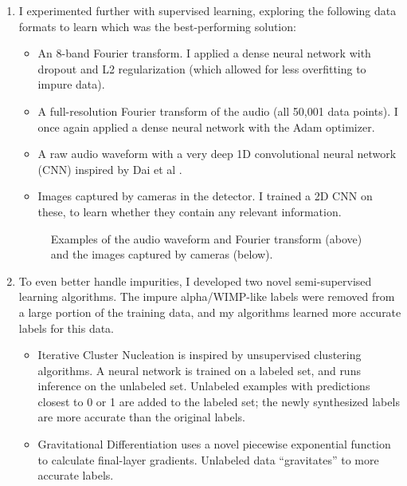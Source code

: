 \documentclass[12pt]{article}
\begin{document}
\begin{enumerate}
    \item I experimented further with supervised learning, exploring the following data formats to learn which was the best-performing solution:
    \begin{itemize}
        \item An 8-band Fourier transform. I applied a dense neural network with dropout \cite{dropout} and L2 regularization (which allowed for less overfitting to impure data).
        \item A full-resolution Fourier transform of the audio (all 50,001 data points). I once again applied a dense neural network with the Adam \cite{adam} optimizer.
        \item A raw audio waveform with a very deep 1D convolutional neural network (CNN) inspired by Dai et al \cite{verydeepconvnets}.
        \item Images captured by cameras in the detector. I trained a 2D CNN on these, to learn whether they contain any relevant information.
    \end{itemize}
    \begin{figure}[ht]
        \centering
        \qquad
        \caption{Examples of the audio waveform and Fourier transform (above) and the images captured by cameras (below).}
    \end{figure}
    \item To even better handle impurities, I developed two novel semi-supervised learning algorithms. The impure alpha/WIMP-like labels were removed from a large portion of the training data, and my algorithms learned more accurate labels for this data.
    \begin{itemize}
        \item Iterative Cluster Nucleation is inspired by unsupervised clustering algorithms. A neural network is trained on a labeled set, and runs inference on the unlabeled set. Unlabeled examples with predictions closest to 0 or 1 are added to the labeled set; the newly synthesized labels are more accurate than the original labels.
        \item Gravitational Differentiation uses a novel piecewise exponential function to calculate final-layer gradients. Unlabeled data ``gravitates'' to more accurate labels.
    \end{itemize}
\end{enumerate}
\end{document}
